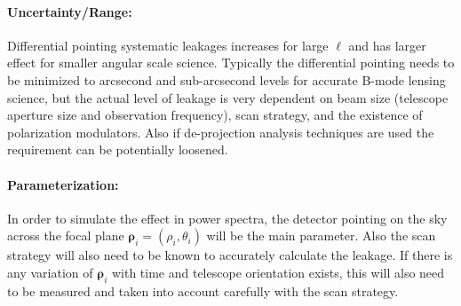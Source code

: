 \paragraph{Uncertainty/Range:}
Differential pointing systematic leakages increases for large $\ell$ and has larger effect for smaller angular scale science. Typically the differential pointing needs to be minimized to arcsecond and sub-arcsecond levels for accurate B-mode lensing science, but the actual level of leakage is very dependent on beam size (telescope aperture size and observation frequency), scan strategy, and the existence of polarization modulators. Also if de-projection analysis techniques are used the requirement can be potentially loosened.

\paragraph{Parameterization:}
In order to simulate the effect in power spectra, the detector pointing on the sky across the focal plane $\boldsymbol{\rho}_{i} = (\rho_{i},\theta_{i})$ will be the main parameter. Also the scan strategy will also need to be known to accurately calculate the leakage. If there is any variation of $\boldsymbol{\rho}_{i}$ with time and telescope orientation exists, this will also need to be measured and taken into account carefully with the scan strategy.